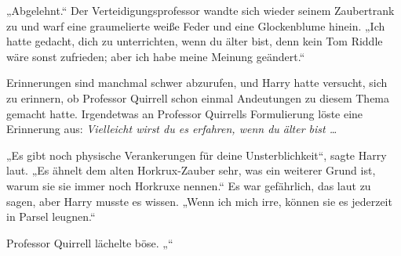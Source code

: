 „Abgelehnt.“
Der Verteidigungsprofessor wandte sich wieder seinem Zaubertrank zu und warf eine graumelierte weiße Feder und eine Glockenblume hinein.
„Ich hatte gedacht, dich zu unterrichten, wenn du älter bist, denn kein Tom Riddle wäre sonst zufrieden; aber ich habe meine Meinung geändert.“

Erinnerungen sind manchmal schwer abzurufen, und Harry hatte versucht, sich zu erinnern, ob Professor Quirrell schon einmal Andeutungen zu diesem Thema gemacht hatte. Irgendetwas an Professor Quirrells Formulierung löste eine Erinnerung aus:
\emph{Vielleicht wirst du es erfahren, wenn du älter bist …}

„Es gibt noch physische Verankerungen für deine Unsterblichkeit“, sagte Harry laut.
„Es ähnelt dem alten Horkrux-Zauber sehr, was ein weiterer Grund ist, warum sie sie immer noch Horkruxe nennen.“
Es war gefährlich, das laut zu sagen, aber Harry musste es wissen.
„Wenn ich mich irre, können sie es jederzeit in Parsel leugnen.“

Professor Quirrell lächelte böse.
„“

